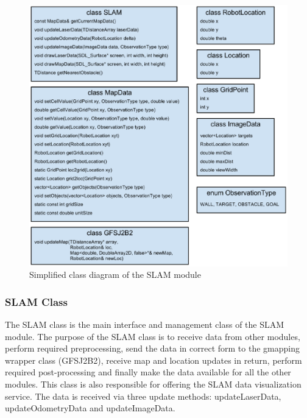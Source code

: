 \documentclass[a4paper,10pt]{article}
\begin{document}
\begin{figure}[h]	%
\begin{center}
\includegraphics[width=16.0cm]{slam_1.eps}
\caption{Simplified class diagram of the SLAM module}
\label{slam_classes} %
\end{center}
\end{figure}

\subsubsection{SLAM Class}

The SLAM class is the main interface and management class of the SLAM module. The purpose of the SLAM class is to receive data from other modules, perform required preprocessing, send the data in correct form to the gmapping wrapper class (GFSJ2B2), receive map and location updates in return, perform required post-processing and finally make the data available for all the other modules. This class is also responsible for offering the SLAM data visualization service. The data is received via three update methods: updateLaserData, updateOdometryData and updateImageData. 
\end{document}
